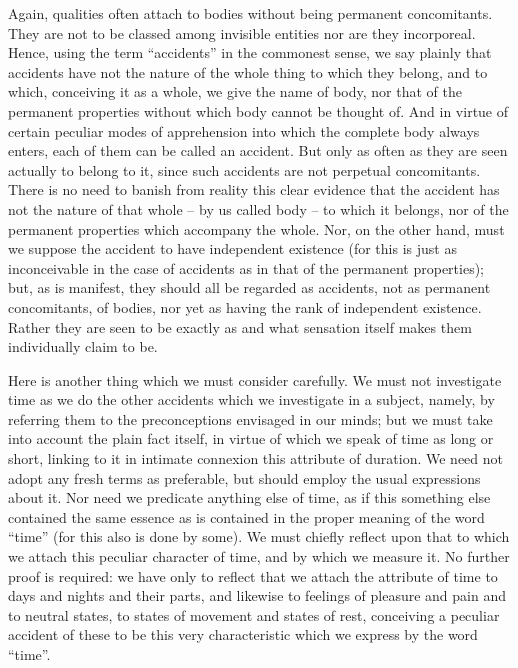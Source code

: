 \documentclass{stex}
\begin{document}
Again, qualities often attach to bodies without being permanent concomitants.
They are not to be classed among invisible entities nor are they incorporeal.
Hence, using the term \enquote{accidents} in the commonest sense, we say plainly that accidents have not the nature of the whole thing to which they belong, and to which, conceiving it as a whole, we give the name of body, nor that of the permanent properties without which body cannot be thought of.
And in virtue of certain peculiar modes of apprehension into which the complete body always enters, each of them can be called an accident.
But only as often as they are seen actually to belong to it, since such accidents are not perpetual concomitants.
There is no need to banish from reality this clear evidence that the accident has not the nature of that whole – by us called body – to which it belongs, nor of the permanent properties which accompany the whole.
Nor, on the other hand, must we suppose the accident to have independent existence (for this is just as inconceivable in the case of accidents as in that of the permanent properties); but, as is manifest, they should all be regarded as accidents, not as permanent concomitants, of bodies, nor yet as having the rank of independent existence.
Rather they are seen to be exactly as and what sensation itself makes them individually claim to be.

Here is another thing which we must consider carefully.
We must not investigate time as we do the other accidents which we investigate in a subject, namely, by referring them to the preconceptions envisaged in our minds; but we must take into account the plain fact itself, in virtue of which we speak of time as long or short, linking to it in intimate connexion this attribute of duration.
We need not adopt any fresh terms as preferable, but should employ the usual expressions about it.
Nor need we predicate anything else of time, as if this something else contained the same essence as is contained in the proper meaning of the word \enquote{time} (for this also is done by some).
We must chiefly reflect upon that to which we attach this peculiar character of time, and by which we measure it.
No further proof is required: we have only to reflect that we attach the attribute of time to days and nights and their parts, and likewise to feelings of pleasure and pain and to neutral states, to states of movement and states of rest, conceiving a peculiar accident of these to be this very characteristic which we express by the word \enquote{time}.
\end{document}
